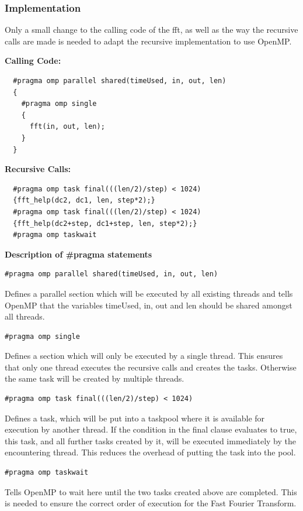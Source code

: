 \subsubsection{Implementation}

Only a small change to the calling code of the fft, as well as the way the recursive calls are made is needed to adapt the recursive implementation to use OpenMP.

\textbf{Calling Code:}
\begin{lstlisting}
  #pragma omp parallel shared(timeUsed, in, out, len)
  {
    #pragma omp single
    {
      fft(in, out, len);
    }
  }
\end{lstlisting}

\textbf{Recursive Calls:}
\begin{lstlisting}
  #pragma omp task final(((len/2)/step) < 1024)
  {fft_help(dc2, dc1, len, step*2);}
  #pragma omp task final(((len/2)/step) < 1024)
  {fft_help(dc2+step, dc1+step, len, step*2);}
  #pragma omp taskwait
\end{lstlisting}

\textbf{Description of \#pragma statements}
\begin{lstlisting}
#pragma omp parallel shared(timeUsed, in, out, len)
\end{lstlisting}
Defines a parallel section which will be executed by all existing threads and tells OpenMP that the variables timeUsed, in, out and len should be shared amongst all threads.

\begin{lstlisting}
#pragma omp single
\end{lstlisting}
Defines a section which will only be executed by a single thread. This ensures that only one thread executes the recursive calls and creates the tasks. Otherwise the same task will be created by multiple threads.

\begin{lstlisting}
#pragma omp task final(((len/2)/step) < 1024)
\end{lstlisting}
Defines a task, which will be put into a taskpool where it is available for execution by another thread. If the condition in the final clause evaluates to true,
this task, and all further tasks created by it, will be executed immediately by the encountering thread. This reduces the overhead of putting the task into the pool.

\pagebreak
\begin{lstlisting}
#pragma omp taskwait
\end{lstlisting}
Tells OpenMP to wait here until the two tasks created above are completed. This is needed to ensure the correct order of execution for the Fast Fourier Transform.

